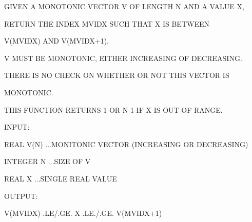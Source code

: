 \begin{DoxyItemize}
\item G\+I\+V\+E\+N A M\+O\+N\+O\+T\+O\+N\+I\+C V\+E\+C\+T\+O\+R V O\+F L\+E\+N\+G\+T\+H N A\+N\+D A V\+A\+L\+U\+E X,
\item R\+E\+T\+U\+R\+N T\+H\+E I\+N\+D\+E\+X M\+V\+I\+D\+X S\+U\+C\+H T\+H\+A\+T X I\+S B\+E\+T\+W\+E\+E\+N
\item V(\+M\+V\+I\+D\+X) A\+N\+D V(M\+V\+I\+D\+X+1).
\item 
\item V M\+U\+S\+T B\+E M\+O\+N\+O\+T\+O\+N\+I\+C, E\+I\+T\+H\+E\+R I\+N\+C\+R\+E\+A\+S\+I\+N\+G O\+F D\+E\+C\+R\+E\+A\+S\+I\+N\+G.
\item T\+H\+E\+R\+E I\+S N\+O C\+H\+E\+C\+K O\+N W\+H\+E\+T\+H\+E\+R O\+R N\+O\+T T\+H\+I\+S V\+E\+C\+T\+O\+R I\+S
\item M\+O\+N\+O\+T\+O\+N\+I\+C.
\item 
\item T\+H\+I\+S F\+U\+N\+C\+T\+I\+O\+N R\+E\+T\+U\+R\+N\+S 1 O\+R N-\/1 I\+F X I\+S O\+U\+T O\+F R\+A\+N\+G\+E.
\item 
\item I\+N\+P\+U\+T\+:
\item 
\item R\+E\+A\+L V(\+N) ...M\+O\+N\+I\+T\+O\+N\+I\+C V\+E\+C\+T\+O\+R (I\+N\+C\+R\+E\+A\+S\+I\+N\+G O\+R D\+E\+C\+R\+E\+A\+S\+I\+N\+G)
\item I\+N\+T\+E\+G\+E\+R N ...S\+I\+Z\+E O\+F V
\item R\+E\+A\+L X ...S\+I\+N\+G\+L\+E R\+E\+A\+L V\+A\+L\+U\+E
\item 
\item O\+U\+T\+P\+U\+T\+:
\item 
\item V(\+M\+V\+I\+D\+X) .L\+E/.G\+E. X .L\+E./.G\+E. V(M\+V\+I\+D\+X+1) 
\end{DoxyItemize}